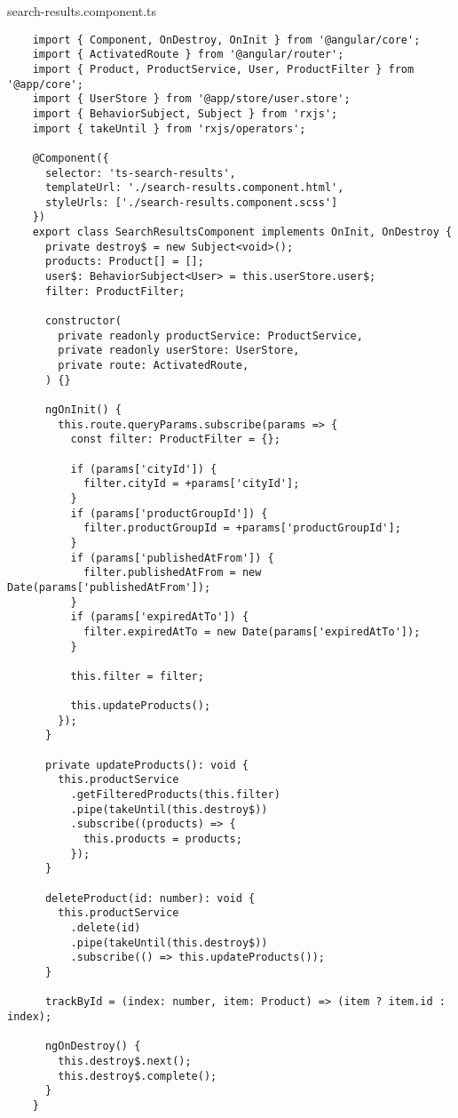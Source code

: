 search-results.component.ts
\begin{lstlisting}
    import { Component, OnDestroy, OnInit } from '@angular/core';
    import { ActivatedRoute } from '@angular/router';
    import { Product, ProductService, User, ProductFilter } from '@app/core';
    import { UserStore } from '@app/store/user.store';
    import { BehaviorSubject, Subject } from 'rxjs';
    import { takeUntil } from 'rxjs/operators';
    
    @Component({
      selector: 'ts-search-results',
      templateUrl: './search-results.component.html',
      styleUrls: ['./search-results.component.scss']
    })
    export class SearchResultsComponent implements OnInit, OnDestroy {
      private destroy$ = new Subject<void>();
      products: Product[] = [];
      user$: BehaviorSubject<User> = this.userStore.user$;
      filter: ProductFilter;
    
      constructor(
        private readonly productService: ProductService,
        private readonly userStore: UserStore,
        private route: ActivatedRoute,
      ) {}
    
      ngOnInit() {
        this.route.queryParams.subscribe(params => {
          const filter: ProductFilter = {};
    
          if (params['cityId']) {
            filter.cityId = +params['cityId'];
          }
          if (params['productGroupId']) {
            filter.productGroupId = +params['productGroupId'];
          }
          if (params['publishedAtFrom']) {
            filter.publishedAtFrom = new Date(params['publishedAtFrom']);
          }
          if (params['expiredAtTo']) {
            filter.expiredAtTo = new Date(params['expiredAtTo']);
          }
    
          this.filter = filter;
    
          this.updateProducts();
        });
      }
    
      private updateProducts(): void {
        this.productService
          .getFilteredProducts(this.filter)
          .pipe(takeUntil(this.destroy$))
          .subscribe((products) => {
            this.products = products;
          });
      }
    
      deleteProduct(id: number): void {
        this.productService
          .delete(id)
          .pipe(takeUntil(this.destroy$))
          .subscribe(() => this.updateProducts());
      }
    
      trackById = (index: number, item: Product) => (item ? item.id : index);
    
      ngOnDestroy() {
        this.destroy$.next();
        this.destroy$.complete();
      }
    }    
\end{lstlisting}

